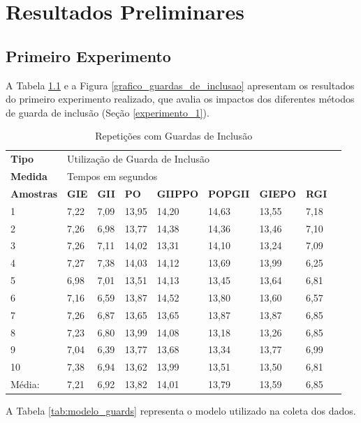 \chapter[Resultados Preliminares]{Resultados Preliminares}

\section{Primeiro Experimento}

A Tabela \ref{tab:tabela_guarda_de_inclusao} e a Figura 
\ref{grafico_guardas_de_inclusao} apresentam os resultados
 do primeiro experimento realizado, que avalia os impactos
 dos diferentes métodos de guarda de inclusão (Seção \ref{experimento_1}).

\begin{table}[!ht]
\centering
\caption{Repetições com Guardas de Inclusão}
\label{tab:tabela_guarda_de_inclusao}
\begin{tiny}
\begin{tabular}{lp{1cm}p{1cm}p{1cm}p{1cm}p{1cm}p{1cm}p{1cm}p{1cm}}
\toprule
\textbf{Tipo} & \multicolumn{7}{l}{Utilização de Guarda de Inclusão} \\
\textbf{Medida} & \multicolumn{7}{l}{Tempos em segundos } \\
\textbf{Amostras} & \textbf{GIE} & \textbf{GII} & \textbf{PO} & 
\textbf{GIIPPO} & \textbf{POPGII} & \textbf{GIEPO} & \textbf{RGI} \\ \midrule
 1  & 7,22 & 7,09 & 13,95  &  14,20 &14,63   &  13,55 &  7,18  \\ \midrule
 2  & 7,26 & 6,98 & 13,77  &  14,38 & 14,36  &  13,46 & 7,10   \\ \midrule
 3  & 7,26 & 7,11 & 14,02  &  13,31 & 14,10  &  13,24 &7,09    \\ \midrule
 4  & 7,27 & 7,38 & 14,03  &  14,12 & 13,69  &  13,99 &6,25    \\ \midrule
 5  & 6,98 & 7,01 & 13,51  &  14,13 & 13,45  &  13,64 &6,81    \\ \midrule
 6  & 7,16 & 6,59 & 13,87  &  14,52 & 13,80  &  13,60 &6,57    \\ \midrule
 7  & 7,26 & 6,87 & 13,65  &  13,65 & 13,87  &  13,87 &6,85    \\ \midrule
 8  & 7,23 & 6,80 & 13,99  &  14,08 & 13,18  &  13,26 &6,85    \\ \midrule
 9  & 7,04 & 6,39 & 13,77  &  13,68 & 13,34  &  13,77 &6,99    \\ \midrule
 10 & 7,38 & 6,94 & 13,62  &  13,99 & 13,51  &  13,50 &6,81    \\ \midrule
 Média: & 7,21 & 6,92 & 13,82& 14,01& 13,79  &  13,59 &6,85    \\ \bottomrule
\end{tabular}
\end{tiny}
\end{table}
A Tabela \ref{tab:modelo_guards} representa o modelo utilizado na coleta dos dados.

